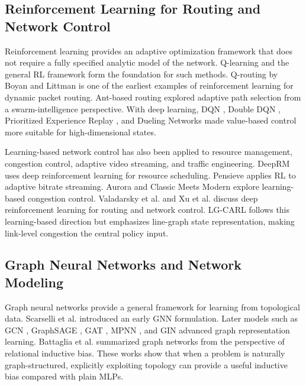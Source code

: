\documentclass[9pt,a4paper,twocolumn,twoside]{rho-class/rho}
\begin{document}
\subsection{Reinforcement Learning for Routing and Network Control}

Reinforcement learning provides an adaptive optimization framework that does not require a fully specified analytic model of the network. Q-learning \cite{watkins1992qlearning} and the general RL framework \cite{sutton2018reinforcement} form the foundation for such methods. Q-routing by Boyan and Littman \cite{boyan1993packet} is one of the earliest examples of reinforcement learning for dynamic packet routing. Ant-based routing \cite{schoonderwoerd1996ant,dicaro1998antnet} explored adaptive path selection from a swarm-intelligence perspective. With deep learning, DQN \cite{mnih2015human}, Double DQN \cite{vanhasselt2016deep}, Prioritized Experience Replay \cite{schaul2016prioritized}, and Dueling Networks \cite{wang2016dueling} made value-based control more suitable for high-dimensional states.

Learning-based network control has also been applied to resource management, congestion control, adaptive video streaming, and traffic engineering. DeepRM \cite{mao2016resource} uses deep reinforcement learning for resource scheduling. Pensieve \cite{mao2017neural} applies RL to adaptive bitrate streaming. Aurora \cite{jay2019deep} and Classic Meets Modern \cite{abbasloo2020classic} explore learning-based congestion control. Valadarsky et al. \cite{valadarsky2017learning} and Xu et al. \cite{xu2018experience} discuss deep reinforcement learning for routing and network control. LG-CARL follows this learning-based direction but emphasizes line-graph state representation, making link-level congestion the central policy input.

\subsection{Graph Neural Networks and Network Modeling}

Graph neural networks provide a general framework for learning from topological data. Scarselli et al. \cite{scarselli2009gnn} introduced an early GNN formulation. Later models such as GCN \cite{kipf2017semi}, GraphSAGE \cite{hamilton2017inductive}, GAT \cite{velickovic2018graph}, MPNN \cite{gilmer2017mpnn}, and GIN \cite{xu2019powerful} advanced graph representation learning. Battaglia et al. \cite{battaglia2018relational} summarized graph networks from the perspective of relational inductive bias. These works show that when a problem is naturally graph-structured, explicitly exploiting topology can provide a useful inductive bias compared with plain MLPs.
\end{document}
